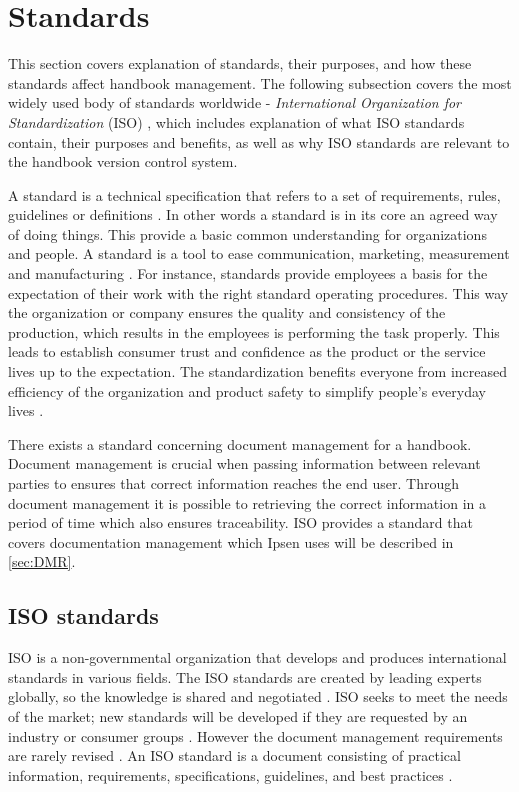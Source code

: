 \section{Standards} \label{sec:standards}
This section covers explanation of standards, their purposes, and how these standards affect handbook management.
The following subsection covers the most widely used body of standards worldwide - \textit{International Organization for Standardization} (ISO) \cite{ISOworldwidemostused}, which includes explanation of what ISO standards contain, their purposes and benefits, as well as why ISO standards are relevant to the handbook version control system.

A standard is a technical specification that refers to a set of requirements, rules, guidelines or definitions \citep[p.~5]{Standard}.
In other words a standard is in its core an agreed way of doing things.
This provide a basic common understanding for organizations and people.
A standard is a tool to ease communication, marketing, measurement and manufacturing \cite{Standardtool}.
For instance, standards provide employees a basis for the expectation of their work with the right standard operating procedures.
This way the organization or company ensures the quality and consistency of the production, which results in the employees is performing the task properly.
This leads to establish consumer trust and confidence as the product or the service lives up to the expectation.
The standardization benefits everyone from increased efficiency of the organization and product safety to simplify people's everyday lives \citep[p.~83]{Standardization}.

There exists a standard concerning document management for a handbook.
Document management is crucial when passing information between relevant parties to ensures that correct information reaches the end user.
Through document management it is possible to retrieving the correct information in a period of time which also ensures traceability.
ISO provides a standard that covers documentation management which Ipsen uses will be described in \cref{sec:DMR}.

\subsection{ISO standards} \label{sec:ISOstandards}
ISO is a non-governmental organization that develops and produces international standards in various fields.
The ISO standards are created by leading experts globally, so the knowledge is shared and negotiated \cite{ISOinfo}.
ISO seeks to meet the needs of the market; new standards will be developed if they are requested by an industry or consumer groups \cite{ISOdeveloping}.
However the document management requirements are rarely revised \cite{Ipsenfirstinterview}.
An ISO standard is a document consisting of practical information, requirements, specifications, guidelines, and best practices \cite{ISOreviewedevery5years}.

